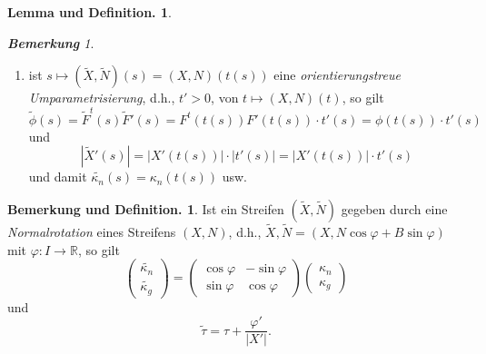 \documentclass[a4paper,oneside,11pt,DIV=12,parskip=half]{scrartcl}
\newcommand{\R}{\mathbb R}
\theoremstyle{plain}
\theoremstyle{definition}
\newtheorem{remark, definition}[theorem]{Bemerkung und Definition.}
\newtheorem{lemma, definition}[theorem]{Lemma und Definition.}
\theoremstyle{remark}
\newtheorem*{remark}{\textbf{Bemerkung}}
\newtheorem*{remark, example}{\textbf{Bemerkung und Beispiel}}
\begin{document}
\begin{lemma, definition}
\begin{remark}
\begin{enumerate}
		\item ist $s \mapsto (\widetilde{X}, \widetilde{N})(s) = (X,N)(t(s))$ eine \emph{orientierungstreue Umparametrisierung}, d.h., $t' >0$, von $t \mapsto (X,N)(t)$, so gilt
		\[\widetilde{\phi}(s) = \widetilde{F}^t(s)\widetilde{F}'(s) = F^t(t(s))F'(t(s))\cdot t'(s) =\phi(t(s)) \cdot t'(s) \] und \[ |\widetilde{X}'(s)| = |X'(t(s))|\cdot|t'(s)| =  |X'(t(s))|\cdot t'(s) \] und damit $\widetilde{\kappa_n}(s)= \kappa_n(t(s))$ usw.
	\end{enumerate}
\end{remark}

\begin{remark, definition}
	Ist ein Streifen $(\widetilde{X},\widetilde{N})$ gegeben durch eine \emph{Normalrotation} eines Streifens $(X,N)$, d.h., $\widetilde{X}, \widetilde{N} = (X,N \cos \varphi + B \sin \varphi)$ mit $\varphi: I \rightarrow \R$, so gilt
	\begin{equation*}
	\begin{pmatrix} 
		\widetilde{\kappa_n}\\
		\widetilde{\kappa_g}
	\end{pmatrix}
	=
	 \begin{pmatrix} 
	 \cos \varphi & - \sin \varphi \\
	 \sin \varphi & \cos \varphi
	 \end{pmatrix}
	 \begin{pmatrix}
	 \kappa_n\\
	 \kappa_g
	 \end{pmatrix}
	\end{equation*} und
	$$\widetilde{\tau} = \tau + \frac{\varphi'}{|X'|}  .$$
	
	
\end{remark, definition}
	
\end{lemma, definition}
\end{document}
